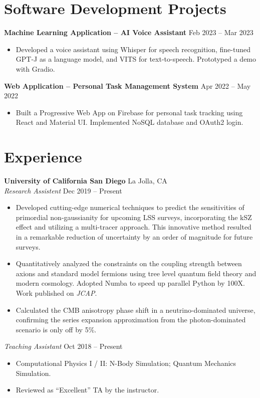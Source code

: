 \documentclass[letterpaper,12pt]{article}
\newenvironment{zitemize}{
\begin{itemize} \vspace{-.9em}\itemsep 0pt \parskip 0pt}
{\end{itemize}\vspace{-.5em}}
\newcommand{\proglang}[1]{#1}
\begin{document}
\section{Software Development Projects}
\textbf{Machine Learning Application -- AI Voice Assistant} \hfill Feb 2023 -- Mar 2023 \\
\begin{zitemize}
    \item Developed a voice assistant using \proglang{Whisper} for speech recognition, fine-tuned \proglang{GPT-J} as a language model, and \proglang{VITS} for text-to-speech. Prototyped a demo with \proglang{Gradio}.
\end{zitemize}

\textbf{Web Application -- Personal Task Management System} \hfill Apr 2022 -- May 2022 \\
\begin{zitemize}
    \item Built a Progressive Web App on \proglang{Firebase} for personal task tracking using \proglang{React} and \proglang{Material UI}. Implemented \proglang{NoSQL} database and \proglang{OAuth2} login.
\end{zitemize}


\section{Experience}
\textbf{University of California San Diego} \hfill La Jolla, CA \\
\textit{Research Assistent} \hfill Dec 2019 -- Present \\
\begin{zitemize}
    \item Developed cutting-edge numerical techniques to predict the sensitivities of primordial non-gaussianity for upcoming LSS surveys, incorporating the kSZ effect and utilizing a multi-tracer approach. This innovative method resulted in a remarkable reduction of uncertainty by an order of magnitude for future surveys.
    \item Quantitatively analyzed the constraints on the coupling strength between axions and standard model fermions using tree level quantum field theory and modern cosmology. Adopted \proglang{Numba} to speed up parallel \proglang{Python} by 100X. Work published on \textit{JCAP}.
    \item Calculated the CMB anisotropy phase shift in a neutrino-dominated universe, confirming the series expansion approximation from the photon-dominated scenario is only off by 5\%.
\end{zitemize}
\vspace{-0.5em}
\textit{Teaching Assistant} \hfill Oct 2018 -- Present \\
\begin{zitemize}
    \item Computational Physics I / II: N-Body Simulation; Quantum Mechanics Simulation. \\
    \item Reviewed as ``Excellent'' TA by the instructor.
\end{zitemize}
\end{document}

